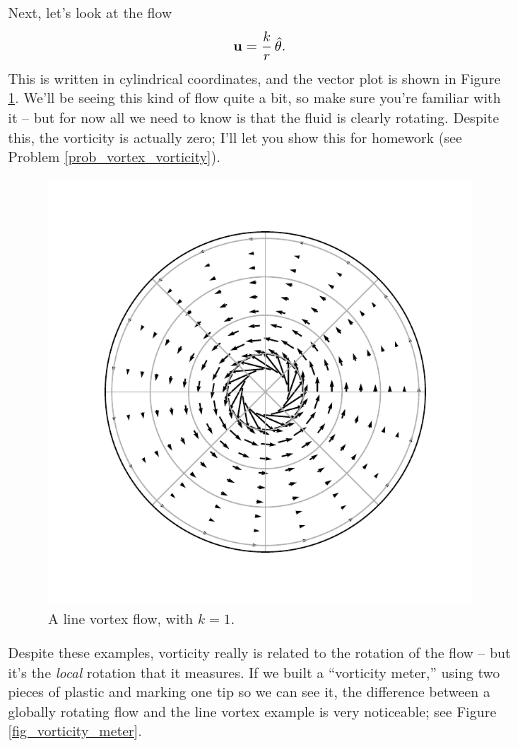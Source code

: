 \begin{example}
\label{ex_vorticity_line_vortex}
Next, let's look at the flow
\begin{equation}
\mathbf{u} = \frac{k}{r} \, \hat{\theta}.
\end{equation}
This is written in cylindrical coordinates, and the vector plot is shown in Figure \ref{fig_vortex}.  We'll be seeing this kind of flow quite a bit, so make sure you're familiar with it -- but for now all we need to know is that the fluid is clearly rotating.  Despite this, the vorticity is actually zero; I'll let you show this for homework (see Problem \ref{prob_vortex_vorticity}).
\end{example}

\begin{figure}
\centering
\includegraphics[width=0.5\linewidth]{Figures/Chapter1/fig_line_vortex_vector}
\caption{A line vortex flow, with $k = 1$.}
\label{fig_vortex}
\end{figure}

Despite these examples, vorticity really is related to the rotation of the flow -- but it's the \emph{local} rotation that it measures.  If we built a ``vorticity meter,'' using two pieces of plastic and marking one tip so we can see it, the difference between a globally rotating flow and the line vortex example is very noticeable; see Figure \ref{fig_vorticity_meter}.

